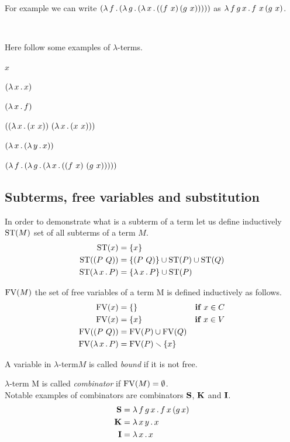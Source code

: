 \documentclass[12pt,a4paper]{report}
\newcommand{\lets}{let us\xspace}
\newcommand{\lterm}{$\lambda$-term\xspace}
\newcommand{\lterms}{$\lambda$-terms\xspace}
\begin{document}
For example we can write
$( \lambda \, f \, . \, ( \lambda \, g \, . \, ( \lambda \, x \, . \, ((f~x)\,(g~x)) ) ) )$
as $\lambda \, f\,g\,x \, . \, f~x\,(g~x)$.

\newcommand{\ods}{\hspace{3mm}}

~

Here follow some examples of \lterms. \vspace{1mm}

\ods $x$

\ods $( \lambda \, x \, . \, x )$

\ods $( \lambda \, x \, . \, f )$

\ods $(( \lambda \, x \, . \, (x~x) )~( \lambda \, x \, . \, (x~x) ))$

\ods $( \lambda \, x \, . \, ( \lambda \, y \, . \, x ) )$

\ods $( \lambda \, f \, . \, ( \lambda \, g \, . \, ( \lambda \, x \, . \, ((f~x)~(g~x)) ) ) )$


\subsection{ Subterms, free variables and substitution }

In order to demonstrate what is a subterm of a term
\lets define inductively $\mathop{\mathrm{ST}}(M)$ set of all subterms of a term $M$.
\begin{align*}
\mathop{\mathrm{ST}}(x)          &= \{x\} \\
\mathop{\mathrm{ST}}((P~Q))      &= \{(P~Q)\} \cup \mathop{\mathrm{ST}}(P) \cup \mathop{\mathrm{ST}}(Q) \\
\mathop{\mathrm{ST}}(\lambda \, x \, . \, P) &= \{\lambda \, x \, . \, P\} \cup \mathop{\mathrm{ST}}(P) 
\end{align*}

 
$\mathop{\mathrm{FV}}(M)$ the set of free variables of a term M is defined inductively as follows.
\begin{align*}
\mathop{\mathrm{FV}}(x)          &= \{\}                        &\textbf{if } x \in C  \\
\mathop{\mathrm{FV}}(x)          &= \{x\}                       &\textbf{if } x \in V  \\
\mathop{\mathrm{FV}}((P~Q))      &= \mathop{\mathrm{FV}}(P) \cup \mathop{\mathrm{FV}}(Q)          &          \\
\mathop{\mathrm{FV}}(\lambda \, x \, . \, P) &= \mathop{\mathrm{FV}}(P) \smallsetminus \{x\} &
\end{align*}

A variable in \lterm $M$ is called \textit{bound} if it is not free.

\lterm M is called \textit{combinator} if $\mathop{\mathrm{FV}}(M)=\emptyset$.\\


Notable examples of combinators are combinators
$\mathbf{S}$, $\mathbf{K}$ and $\mathbf{I}$.
\begin{align*}
\mathbf{S} &= \lambda \, f\,g\,x \, . \, f\,x\,(g\,x) \\
\mathbf{K} &= \lambda \, x\,y \, . \, x \\
\mathbf{I} &= \lambda \, x \, . \, x 
\end{align*}
\end{document}
